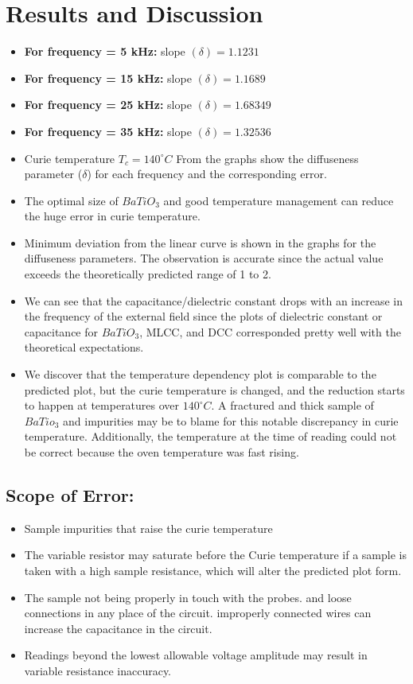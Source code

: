 \section{Results and Discussion}
    \begin{itemize}
        \item \textbf{For frequency = 5 kHz:} slope $(\delta) = 1.1231$
        \item \textbf{For frequency = 15 kHz:} slope $(\delta) = 1.1689$
        \item \textbf{For frequency = 25 kHz:} slope $(\delta) = 1.68349$
        \item \textbf{For frequency = 35 kHz:} slope $(\delta) = 1.32536$
        \item Curie temperature $T_c = 140^\circ C$ From the graphs show the diffuseness parameter ($\delta$) for each frequency and the corresponding error.
        \item The optimal size of $BaTiO_3$ and good temperature management can reduce the huge error in curie temperature.
        \item Minimum deviation from the linear curve is shown in the graphs for the diffuseness parameters. The observation is accurate since the actual value exceeds the theoretically predicted range of 1 to 2.
        \item We can see that the capacitance/dielectric constant drops with an increase in the frequency of the external field since the plots of dielectric constant or capacitance for $BaTiO_3$, MLCC, and DCC corresponded pretty well with the theoretical expectations.
        \item We discover that the temperature dependency plot is comparable to the predicted plot, but the curie temperature is changed, and the reduction starts to happen at temperatures over $140^\circ C$. A fractured and thick sample of $BaTio_3$ and impurities may be to blame for this notable discrepancy in curie temperature. Additionally, the temperature at the time of reading could not be correct because the oven temperature was fast rising.
    \end{itemize}
 
    \subsection{Scope of Error:}
        \begin{itemize}
            \item Sample impurities that raise the curie temperature
            \item The variable resistor may saturate before the Curie temperature if a sample is taken with a high sample resistance, which will alter the predicted plot form.
            \item The sample not being properly in touch with the probes. and loose connections in any place of the circuit. improperly connected wires can increase the capacitance in the circuit.
            \item Readings beyond the lowest allowable voltage amplitude may result in variable resistance inaccuracy.
        \end{itemize}
 
 